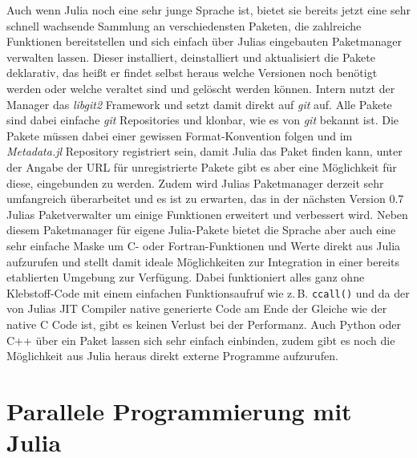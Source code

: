 \documentclass[proseminar,german,utf8]{zihpub}
\newcommand{\zB}[0]{{z.\,B. }}
\begin{document}
Auch wenn Julia noch eine sehr junge Sprache ist, bietet sie bereits jetzt eine sehr schnell wachsende Sammlung an verschiedensten Paketen, die zahlreiche Funktionen bereitstellen und sich einfach über Julias eingebauten Paketmanager verwalten lassen. Dieser installiert, deinstalliert und aktualisiert die Pakete deklarativ, das heißt er findet selbst heraus welche Versionen noch benötigt werden oder welche veraltet sind und gelöscht werden können. Intern nutzt der Manager das \textit{libgit2} Framework und setzt damit direkt auf \textit{git} auf. Alle Pakete sind dabei einfache \textit{git} Repositories und klonbar, wie es von \textit{git} bekannt ist. Die Pakete müssen dabei einer gewissen Format-Konvention folgen und im \textit{Metadata.jl} Repository registriert sein, damit Julia das Paket finden kann, unter der Angabe der URL für unregistrierte Pakete gibt es aber eine Möglichkeit für diese, eingebunden zu werden. Zudem wird Julias Paketmanager derzeit sehr umfangreich überarbeitet und es ist zu erwarten, das in der nächsten Version 0.7 Julias Paketverwalter um einige Funktionen erweitert und verbessert wird. Neben diesem Paketmanager für eigene Julia-Pakete bietet die Sprache aber auch eine sehr einfache Maske um C- oder Fortran-Funktionen und Werte direkt aus Julia aufzurufen und stellt damit ideale Möglichkeiten zur Integration in einer bereits etablierten Umgebung zur Verfügung. Dabei funktioniert alles ganz ohne Klebstoff-Code mit einem einfachen Funktionsaufruf wie \zB \verb|ccall()| und da der von Julias JIT Compiler native generierte Code am Ende der Gleiche wie der native C Code ist, gibt es keinen Verlust bei der Performanz. Auch Python oder C++ über ein Paket lassen sich sehr einfach einbinden, zudem gibt es noch die Möglichkeit aus Julia heraus direkt externe Programme aufzurufen.~\cite{JuliaLangDocumentation}

\section{Parallele Programmierung mit Julia}
\end{document}
